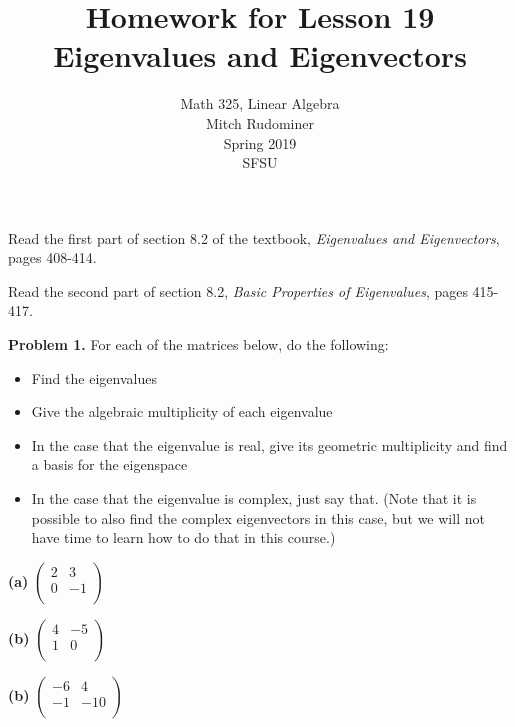 \documentclass[oneside,12pt]{amsart}
\begin{document}
\title{Homework for Lesson 19 \\ Eigenvalues and Eigenvectors}
\author{Math 325, Linear Algebra \\ Mitch Rudominer \\ Spring 2019 \\ SFSU }
\date{}

\maketitle

\bigskip

Read the first part of section 8.2 of the textbook,
 \emph{Eigenvalues and Eigenvectors}, pages 408-414.

 Read the second part of section 8.2, \emph{Basic Properties of Eigenvalues},
 pages 415-417.

\bigskip

\textbf{Problem 1.} For each of the matrices below, do the following:
\begin{itemize}
\item Find the eigenvalues
\item Give the algebraic multiplicity of each eigenvalue
\item In the case that the eigenvalue is real, give its geometric multiplicity
and find a basis for the eigenspace
\item In the case that the eigenvalue is complex, just say that. (Note
that it is possible to also find the complex eigenvectors in this case, but
we will not have time to learn how to do that in this course.)
\end{itemize}

\bigskip

\textbf{(a)}
$
\begin{pmatrix}
2 & 3 \\
0 & -1 \\
\end{pmatrix}
$

\bigskip
\bigskip
\bigskip

\textbf{(b)}
$
\begin{pmatrix}
4 & -5 \\
1 & 0 \\
\end{pmatrix}
$


\bigskip
\bigskip
\bigskip

\textbf{(b)}
$
\begin{pmatrix}
-6 & 4 \\
-1 & -10 \\
\end{pmatrix}
$
\end{document}
